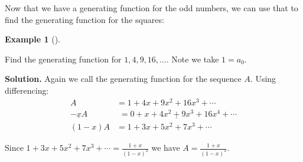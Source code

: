\documentclass[10pt,]{book}
\theoremstyle{plain}
\theoremstyle{definition}
\newtheorem{example}[theorem]{Example}
\theoremstyle{definition}
\theoremstyle{definition}
\numberwithin{equation}{chapter}
\def\d{\displaystyle}
\newcommand{\amp}{ & }
\begin{document}
Now that we have a generating function for the odd numbers, we can use that to find the generating function for the squares:
%
\begin{example}[]\label{example-111}

Find the generating function for \(1, 4, 9, 16, \ldots\). Note we take \(1 = a_0\).
%
\par\medskip\noindent%
\textbf{Solution.}\quad
Again we call the generating function for the sequence \(A\). Using differencing:
\begin{align*}
  A \amp  = 1 + 4x + 9x^2 + 16x^3 + \cdots\\
  \underline{- xA} \amp  \underline{\,\, = 0 + x + 4x^2 + 9x^3 + 16x^4 + \cdots}\\
  (1-x)A \amp  = 1 + 3x + 5x^2 + 7x^3 + \cdots
\end{align*}
%
\par

Since \(1 + 3x + 5x^2 + 7x^3 + \cdots = \d\frac{1+x}{(1-x)^2}\) we have \(A = \d\frac{1+x}{(1-x)^3}\).
%
\end{example}
\par
\end{document}
